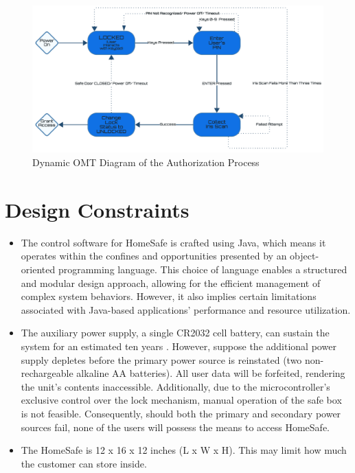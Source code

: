 \documentclass{article}
\begin{document}
\begin{figure}[h]
    \centering
    \includegraphics[scale=0.28]{docs/figs/authorization_process.png}
    \caption{Dynamic OMT Diagram of the Authorization Process \cite{lucidLucidVisual}}
    \label{fig:diagram4}
\end{figure}

\newpage

\section{Design Constraints}

\begin{itemize}
    \item The control software for HomeSafe is crafted using Java, which means it operates within the confines and opportunities presented by an object-oriented programming language. This choice of language enables a structured and modular design approach, allowing for the efficient management of complex system behaviors. However, it also implies certain limitations associated with Java-based applications' performance and resource utilization.
    \item The auxiliary power supply, a single CR2032 cell battery, can sustain the system for an estimated ten years \cite{microbatteryEverythingNeed}. However, suppose the additional power supply depletes before the primary power source is reinstated (two non-rechargeable alkaline AA batteries). All user data will be forfeited, rendering the unit's contents inaccessible. Additionally, due to the microcontroller's exclusive control over the lock mechanism, manual operation of the safe box is not feasible. Consequently, should both the primary and secondary power sources fail, none of the users will possess the means to access HomeSafe.
    \item The HomeSafe is 12 x 16 x 12 inches (L x W x H). This may limit how much the customer can store inside.
\end{itemize}

\newpage

\printbibliography

{\parindent0pt}
\end{document}
